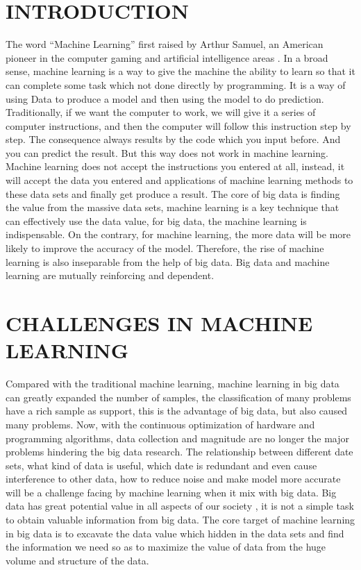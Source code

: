 \documentclass[sigconf]{acmart}
\begin{document}
\section{INTRODUCTION}
The word ``Machine Learning'' first raised by Arthur Samuel, an American pioneer in the computer gaming and artificial intelligence areas \cite{Kohavi1}. In a broad sense, machine learning is a way to give the machine the ability to learn so that it can complete some task which not done directly by programming. It is a way of using Data to produce a model and then using the model to do prediction. Traditionally, if we want the computer to work, we will give it a series of computer instructions, and then the computer will follow this instruction step by step. The consequence always results by the code which you input before. And you can predict the result. But this way does not work in machine learning. Machine learning does not accept the instructions you entered at all, instead, it will accept the data you entered and applications of machine learning methods to these data sets and finally get produce a result. The core of big data is finding the value from the massive data sets, machine learning is a key technique that can effectively use the data value, for big data, the machine learning is indispensable. On the contrary, for machine learning, the more data will be more likely to improve the accuracy of the model. Therefore, the rise of machine learning is also inseparable from the help of big data. Big data and machine learning are mutually reinforcing and dependent.

\section{CHALLENGES IN MACHINE LEARNING}
Compared with the traditional machine learning, machine learning in big data can greatly expanded the number of samples, the classification of many problems have a rich sample as support, this is the advantage of big data, but also caused many problems. Now, with the continuous optimization of hardware and programming algorithms, data collection and magnitude are no longer the major problems hindering the big data research. The relationship between different date sets, what kind of data is useful, which date is redundant and even cause interference to other data, how to reduce noise and make model more accurate will be a challenge facing by machine learning when it mix with big data. Big data has great potential value in all aspects of our society , it is not a simple task to obtain valuable information from big data. The core target of machine learning in big data is  to excavate the data value which hidden in the data sets and find the information we need so as to maximize the value of data from the huge volume and structure of the data.
\end{document}
